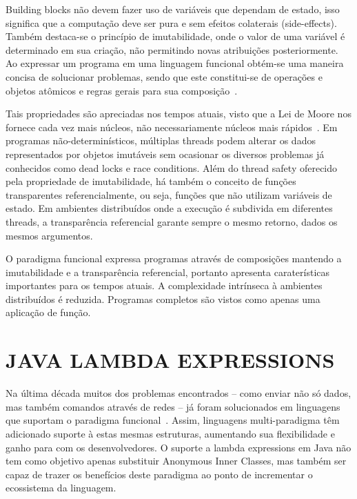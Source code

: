 \documentclass[10pt, conference]{IEEEtran}
\begin{document}
Building blocks não devem fazer uso de variáveis que dependam de estado, isso significa que a computação deve ser pura e sem efeitos colaterais (side-effects). Também destaca-se o princípio de imutabilidade, onde o valor de uma variável é determinado em sua criação, não permitindo novas atribuições posteriormente. Ao expressar um programa em uma linguagem funcional obtém-se uma maneira concisa de solucionar problemas, sendo que este constitui-se de operações e objetos atômicos e regras gerais para sua composição~\cite{michaelson2011introduction}.

Tais propriedades são apreciadas nos tempos atuais, visto que a Lei de Moore nos fornece cada vez mais núcleos, não necessariamente núcleos mais rápidos~\cite{jsr335}. Em programas não-determinísticos, múltiplas threads podem alterar os dados representados por objetos imutáveis sem ocasionar os diversos problemas já conhecidos como dead locks e race conditions. Além do thread safety oferecido pela propriedade de imutabilidade, há também o conceito de funções transparentes referencialmente, ou seja, funções que não utilizam variáveis de estado. Em ambientes distribuídos onde a execução é subdivida em diferentes threads, a transparência referencial garante sempre o mesmo retorno, dados os mesmos argumentos.

O paradigma funcional expressa programas através de composições mantendo a imutabilidade e a transparência referencial, portanto apresenta caraterísticas importantes para os tempos atuais. A complexidade intrínseca à ambientes distribuídos é reduzida. Programas completos são vistos como apenas uma aplicação de função.

\section{JAVA LAMBDA EXPRESSIONS}
\label{sec:lambda-expr}

Na última década muitos dos problemas encontrados -- como enviar não só dados, mas também comandos através de redes -- já foram solucionados em linguagens que suportam o paradigma funcional~\cite{fischer2015java}. Assim, linguagens multi-paradigma têm adicionado suporte à estas mesmas estruturas, aumentando sua flexibilidade e ganho para com os desenvolvedores. O suporte a lambda expressions em Java não tem como objetivo apenas substituir Anonymous Inner Classes, mas também ser capaz de trazer os benefícios deste paradigma ao ponto de incrementar o ecossistema da linguagem.
\end{document}
